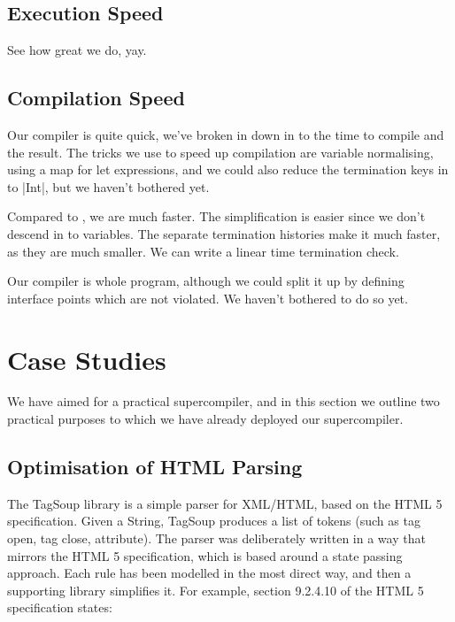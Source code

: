 \documentclass[draft]{sigplanconf}
\begin{document}
\subsection{Execution Speed}

See how great we do, yay.

\subsection{Compilation Speed}

Our compiler is quite quick, we've broken in down in to the time to compile and the result. The tricks we use to speed up compilation are variable normalising, using a map for let expressions, and we could also reduce the termination keys in to |Int|, but we haven't bothered yet.

Compared to \cite{me:ifl2007post}, we are much faster. The simplification is easier since we don't descend in to variables. The separate termination histories make it much faster, as they are much smaller. We can write a linear time termination check.

Our compiler is whole program, although we could split it up by defining interface points which are not violated. We haven't bothered to do so yet.

\section{Case Studies}

We have aimed for a practical supercompiler, and in this section we outline two practical purposes to which we have already deployed our supercompiler.

\subsection{Optimisation of HTML Parsing}
\label{sec:tagsoup}

The TagSoup library \cite{tagsoup} is a simple parser for XML/HTML, based on the HTML 5 specification. Given a String, TagSoup produces a list of tokens (such as tag open, tag close, attribute). The parser was deliberately written in a way that mirrors the HTML 5 specification, which is based around a state passing approach. Each rule has been modelled in the most direct way, and then a supporting library simplifies it. For example, section 9.2.4.10 of the HTML 5 specification states:
\end{document}
